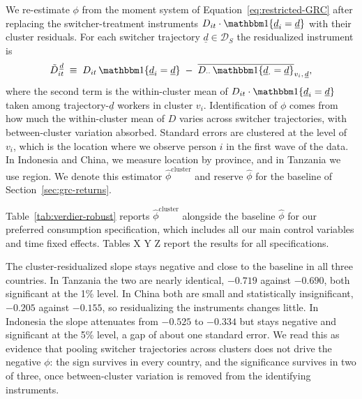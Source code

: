 We re-estimate $\phi$ from the moment system of Equation~\eqref{eq:restricted-GRC} after replacing the switcher-treatment instruments $D_{it}\cdot\mathbbm 1\{\underline d_i = \underline d\}$ with their cluster residuals.
For each switcher trajectory $\underline d \in \mathcal D_S$ the residualized instrument is
\begin{equation}\label{eq:residualized-instrument}
\tilde D_{it}^{\,\underline d} \;\equiv\; D_{it}\,\mathbbm 1\{\underline d_i=\underline d\} \;-\; \overline{D_{\cdot\cdot}\,\mathbbm 1\{\underline d_{\cdot}=\underline d\}}_{v_i,\,\underline d},
\end{equation}
where the second term is the within-cluster mean of $D_{it}\cdot\mathbbm 1\{\underline d_i=\underline d\}$ taken among trajectory-$\underline d$ workers in cluster $v_i$.
Identification of $\phi$ comes from how much the within-cluster mean of $D$ varies across switcher trajectories, with between-cluster variation absorbed.
Standard errors are clustered at the level of $v_i$, which is the location where we observe person $i$ in the first wave of the data.
In Indonesia and China, we measure location by province, and in Tanzania we use region.
We denote this estimator $\hat\phi^{\mathrm{cluster}}$ and reserve $\hat\phi$ for the baseline of Section~\ref{sec:grc-returns}.

Table~\ref{tab:verdier-robust} reports $\hat\phi^{\mathrm{cluster}}$ alongside the baseline $\hat\phi$ for our preferred consumption specification, which includes all our main control variables and time fixed effects.
Tables X Y Z report the results for all specifications. 




The cluster-residualized slope stays negative and close to the baseline in all three countries.
In Tanzania the two are nearly identical, $-0.719$ against $-0.690$, both significant at the 1\% level.
In China both are small and statistically insignificant, $-0.205$ against $-0.155$, so residualizing the instruments changes little.
In Indonesia the slope attenuates from $-0.525$ to $-0.334$ but stays negative and significant at the 5\% level, a gap of about one standard error.
We read this as evidence that pooling switcher trajectories across clusters does not drive the negative $\phi$: the sign survives in every country, and the significance survives in two of three, once between-cluster variation is removed from the identifying instruments.


